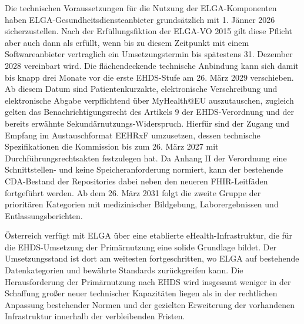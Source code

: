 Die technischen Voraussetzungen für die Nutzung der ELGA-Komponenten haben ELGA-Gesundheitsdiensteanbieter grundsätzlich mit 1. Jänner 2026 sicherzustellen. Nach der Erfüllungsfiktion der ELGA-VO 2015 gilt diese Pflicht aber auch dann als erfüllt, wenn bis zu diesem Zeitpunkt mit einem Softwareanbieter vertraglich ein Umsetzungstermin bis spätestens 31. Dezember 2028 vereinbart wird. Die flächendeckende technische Anbindung kann sich damit bis knapp drei Monate vor die erste EHDS-Stufe am 26. März 2029 verschieben. Ab diesem Datum sind Patientenkurzakte, elektronische Verschreibung und elektronische Abgabe verpflichtend über MyHealth@EU auszutauschen, zugleich gelten das Benachrichtigungsrecht des Artikels 9 der EHDS-Verordnung und der bereits erwähnte Sekundärnutzungs-Widerspruch. Hierfür sind der Zugang und Empfang im Austauschformat EEHRxF umzusetzen, dessen technische Spezifikationen die Kommission bis zum 26. März 2027 mit Durchführungsrechtsakten festzulegen hat. Da Anhang II der Verordnung eine Schnittstellen- und keine Speicheranforderung normiert, kann der bestehende CDA-Bestand der Repositories dabei neben den neueren FHIR-Leitfäden fortgeführt werden. Ab dem 26. März 2031 folgt die zweite Gruppe der prioritären Kategorien mit medizinischer Bildgebung, Laborergebnissen und Entlassungsberichten.

Österreich verfügt mit ELGA über eine etablierte eHealth-Infrastruktur, die für die EHDS-Umsetzung der Primärnutzung eine solide Grundlage bildet. Der Umsetzungsstand ist dort am weitesten fortgeschritten, wo ELGA auf bestehende Datenkategorien und bewährte Standards zurückgreifen kann. Die Herausforderung der Primärnutzung nach EHDS wird insgesamt weniger in der Schaffung großer neuer technischer Kapazitäten liegen als in der rechtlichen Anpassung bestehender Normen und der gezielten Erweiterung der vorhandenen Infrastruktur innerhalb der verbleibenden Fristen.
